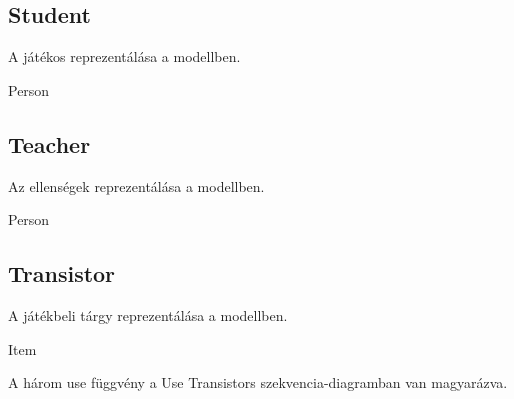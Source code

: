 \subsection{Student}
\begin{class-template-responsibility}
    A játékos reprezentálása a modellben.
\end{class-template-responsibility}
\begin{class-template-baseclass}
    Person
\end{class-template-baseclass}
\begin{class-template-method}
\end{class-template-method}

\subsection{Teacher}
\begin{class-template-responsibility}
    Az ellenségek reprezentálása a modellben.
\end{class-template-responsibility}
\begin{class-template-baseclass}
    Person
\end{class-template-baseclass}

\subsection{Transistor}
\begin{class-template-responsibility}
A játékbeli tárgy reprezentálása a modellben.
\end{class-template-responsibility}
\begin{class-template-interface}
    Item
\end{class-template-interface}
\begin{class-template-method}
    A három use függvény a Use Transistors szekvencia-diagramban van magyarázva.
\end{class-template-method}


